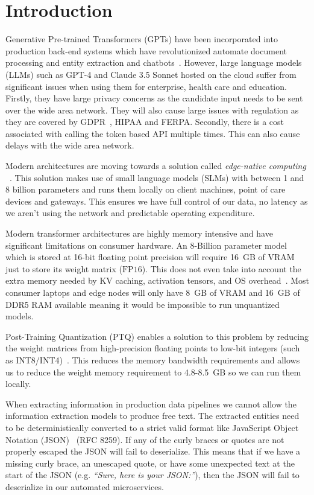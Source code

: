 \documentclass[conference]{IEEEtran}
\begin{document}
\section{Introduction}
\label{sec:intro}

Generative Pre-trained Transformers (GPTs) have been incorporated into production back-end systems which have revolutionized automate document processing and entity extraction and chatbots~\cite{brown2020language}. However, large language models (LLMs) such as GPT-4 and Claude 3.5 Sonnet hosted on the cloud suffer from significant issues when using them for enterprise, health care and education. Firstly, they have large privacy concerns as the candidate input needs to be sent over the wide area network. They will also cause large issues with regulation as they are covered by GDPR~\cite{gdpr2017}, HIPAA and FERPA. Secondly, there is a cost associated with calling the token based API multiple times. This can also cause delays with the wide area network.

Modern architectures are moving towards a solution called \textit{edge-native computing} ~\cite{liu2024edge,ding2024slm_edge}. This solution makes use of small language models (SLMs) with between 1 and 8 billion parameters and runs them locally on client machines, point of care devices and gateways. This ensures we have full control of our data, no latency as we aren’t using the network and predictable operating expenditure.

Modern transformer architectures are highly memory intensive and have significant limitations on consumer hardware. An 8-Billion parameter model which is stored at 16-bit floating point precision will require 16~GB of VRAM just to store its weight matrix ($\text{FP16}$). This does not even take into account the extra memory needed by KV caching, activation tensors, and OS overhead~\cite{dettmers2022llm,frantar2023gptq}. Most consumer laptops and edge nodes will only have 8~GB of VRAM and 16~GB of DDR5 RAM available meaning it would be impossible to run unquantized models.

Post-Training Quantization (PTQ) enables a solution to this problem by reducing the weight matrices from high-precision floating points to low-bit integers (such as INT8/INT4)~\cite{lin2024awq,dettmers2023qlora}. This reduces the memory bandwidth requirements and allows us to reduce the weight memory requirement to 4.8-8.5~GB so we can run them locally.

When extracting information in production data pipelines we cannot allow the information extraction models to produce free text. The extracted entities need to be deterministically converted to a strict valid format like JavaScript Object Notation (JSON)~\cite{rfc8259} (RFC 8259). If any of the curly braces or quotes are not properly escaped the JSON will fail to deserialize. This means that if we have a missing curly brace, an unescaped quote, or have some unexpected text at the start of the JSON (e.g. \textit{``Sure, here is your JSON:''}), then the JSON will fail to deserialize in our automated microservices.
\end{document}
